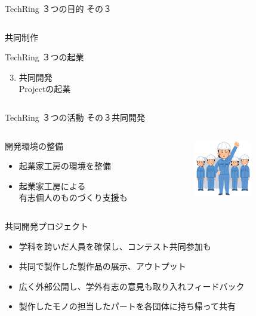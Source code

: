 \documentclass[dvipdfmx]{beamer}
\begin{document}
\begin{frame}{TechRing ３つの目的 その３}
\begin{columns}
    \begin{column}{0.30\textwidth}
      \begin{alertblock}{共同制作}
        \begin{footnotesize}
          TechRing ３つの起業 \par
          \begin{enumerate}
            \setcounter{enumi}{2}
            \item 共同開発\\Projectの起業
          \end{enumerate}
        \end{footnotesize}
      \end{alertblock}
    \end{column}
  \end{columns}
\end{frame}

\begin{frame}{TechRing ３つの活動 その３}{共同開発}
  \begin{columns}
    \begin{column}{0.63\textwidth}
      \begin{block}{開発環境の整備}
        \begin{itemize}
          \item 起業家工房の環境を整備
          \item 起業家工房による\\有志個人のものづくり支援も
        \end{itemize}
      \end{block}
    \end{column}

    \begin{column}{0.28\textwidth}
      \begin{center}
        \includegraphics[width=2.5cm]{pic/Team.png}
      \end{center}
    \end{column}
  \end{columns}

  \begin{alertblock}{共同開発プロジェクト}
    \begin{itemize}
      \item 学科を跨いだ人員を確保し、コンテスト共同参加も
      \item 共同で製作した製作品の展示、アウトプット
      \item 広く外部公開し、学外有志の意見も取り入れフィードバック
      \item 製作したモノの担当したパートを各団体に持ち帰って共有
    \end{itemize}
  \end{alertblock}
\end{frame}
\end{document}
